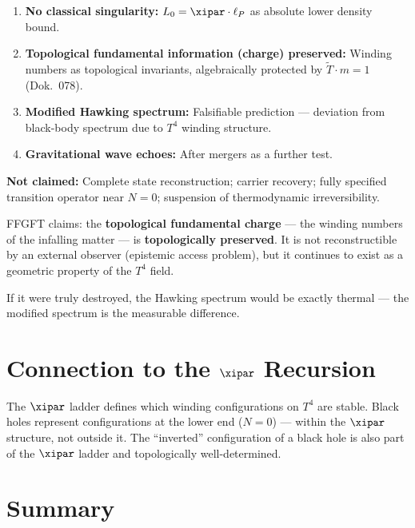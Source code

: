 \begin{enumerate}
  \item \textbf{No classical singularity:} $L_0 = \xipar \cdot \ell_P$ as absolute lower density bound.
  \item \textbf{Topological fundamental information (charge) preserved:} Winding numbers as topological invariants, algebraically protected by $\tilde{T} \cdot m = 1$ (Dok.~078).
  \item \textbf{Modified Hawking spectrum:} Falsifiable prediction --- deviation from black-body spectrum due to $T^4$ winding structure.
  \item \textbf{Gravitational wave echoes:} After mergers as a further test.
\end{enumerate}

\textbf{Not claimed:} Complete state reconstruction; carrier recovery; fully specified transition operator near $N = 0$; suspension of thermodynamic irreversibility.

\begin{keyresult}
FFGFT claims: the \textbf{topological fundamental charge} --- the winding numbers of the infalling matter --- is \textbf{topologically preserved}. It is not reconstructible by an external observer (epistemic access problem), but it continues to exist as a geometric property of the $T^4$ field.

If it were truly destroyed, the Hawking spectrum would be exactly thermal --- the modified spectrum is the measurable difference.
\end{keyresult}

\section{Connection to the $\xipar$ Recursion}

The $\xipar$ ladder defines which winding configurations on $T^4$ are stable. Black holes represent configurations at the lower end ($N = 0$) --- within the $\xipar$ structure, not outside it. The ``inverted'' configuration of a black hole is also part of the $\xipar$ ladder and topologically well-determined.

\section*{Summary}

